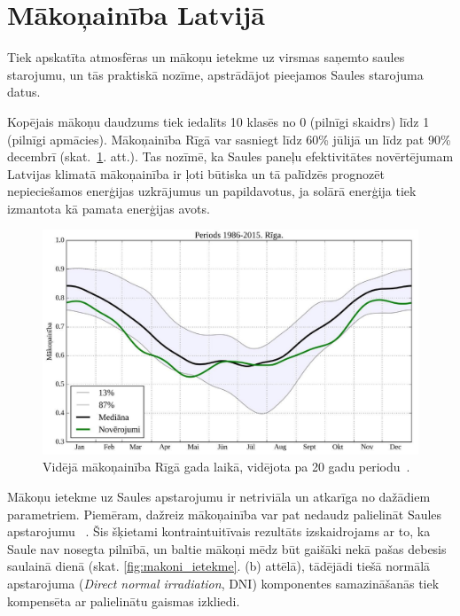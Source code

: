 \section{Mākoņainība Latvijā}

Tiek apskatīta atmosfēras un mākoņu ietekme uz virsmas saņemto saules starojumu, un tās praktiskā nozīme, apstrādājot pieejamos Saules starojuma datus.

Kopējais mākoņu daudzums tiek iedalīts 10 klasēs no 0 (pilnīgi skaidrs) līdz 1 (pilnīgi apmācies). Mākoņainība Rīgā var sasniegt līdz 60\% jūlijā un līdz pat 90\% decembrī (skat.~\ref{fig:makoni_Riga}. att.). Tas nozīmē, ka Saules paneļu efektivitātes novērtējumam Latvijas klimatā mākoņainība ir ļoti būtiska un tā palīdzēs prognozēt nepieciešamos enerģijas uzkrājumus un papildavotus, ja solārā enerģija tiek izmantota kā pamata enerģijas avots.
\begin{figure}[h]
	\centering
	\includegraphics[width=0.8\linewidth]{figures/misc/makoni_riga.jpg}
	\caption{Vidējā mākoņainība Rīgā gada laikā, vidējota pa 20 gadu periodu~\cite{cloudsModlab}.}
	\label{fig:makoni_Riga}
\end{figure}

Mākoņu ietekme uz Saules apstarojumu ir netriviāla un atkarīga no dažādiem parametriem. Piemēram, dažreiz mākoņainība var pat nedaudz palielināt Saules apstarojumu ~\cite{CloudCoverageImpactOnIrradiance}. Šis šķietami kontraintuitīvais rezultāts izskaidrojams ar to, ka Saule nav nosegta pilnībā, un baltie mākoņi mēdz būt gaišāki nekā pašas debesis saulainā dienā (skat. \ref{fig:makoni_ietekme}. (b) attēlā), tādējādi tiešā normālā apstarojuma (\textit{Direct normal irradiation}, DNI) komponentes samazināšanās tiek kompensēta ar palielinātu gaismas izkliedi. 

